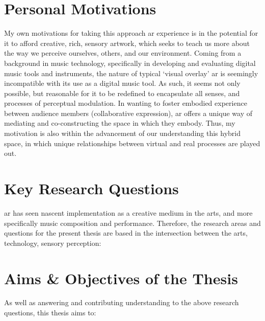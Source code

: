 \section{Personal Motivations}\label{sec: introduction-motivations}
My own motivations for taking this approach \gls{ar} experience is in the potential for it to afford creative, rich, sensory artwork, which seeks to teach us more about the way we perceive ourselves, others, and our environment. Coming from a background in music technology, specifically in developing and evaluating digital music tools and instruments, the nature of typical `visual overlay' \gls{ar} is seemingly incompatible with its use as a digital music tool. As such, it seems not only possible, but reasonable for it to be redefined to encapsulate all senses, and processes of perceptual modulation. In wanting to foster embodied experience between audience members (collaborative expression), \gls{ar} offers a unique way of mediating and co-constructing the space in which they embody. Thus, my motivation is also within the advancement of our understanding this hybrid space, in which unique relationships between virtual and real processes are played out.



\section{Key Research Questions}\label{sec: introduction-researchquestions}
\gls{ar} has seen nascent implementation as a creative medium in the arts, and more specifically music composition and performance. Therefore, the research areas and questions for the present thesis are based in the intersection between the arts, technology, sensory perception:

\RQall

\section{Aims \& Objectives of the Thesis}\label{sec: introduction-aims}
As well as answering and contributing understanding to the above research questions, this thesis aims to:

